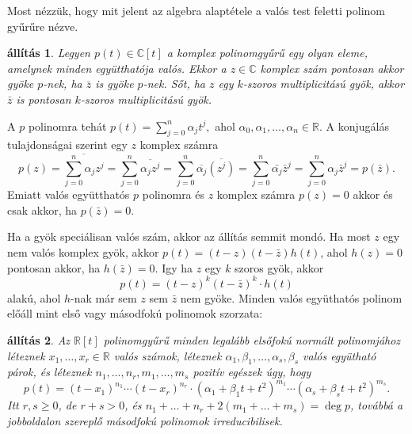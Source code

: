 \documentclass[9pt, showtrims]{memoir}
\makeatletter
\renewenvironment{proof}[1][\proofname]
    {\par\pushQED{\qed}%
    \normalfont \topsep6\p@\@plus6\p@\relax
    \trivlist
    \item[\hskip\labelsep
        \itshape
    #1\@addpunct{:}]\ignorespaces}
    {\popQED\endtrivlist\@endpefalse}
\theoremstyle{plain}
\newtheorem{proposition}{állítás}[section]
\theoremstyle{remark}
\theoremstyle{definition}
\makeatother
\begin{document}
Most nézzük, hogy mit jelent az algebra alaptétele a valós test feletti polinom gyűrűre nézve.
\begin{proposition}
    Legyen $p\left( t \right)\in\mathbb{C}[t]$ a komplex polinomgyűrű egy olyan eleme, 
    amelynek minden együtthatója valós.
    Ekkor a $z\in \mathbb{C}$ komplex szám pontosan akkor gyöke $p$-nek, 
    ha $\bar{z}$ is gyöke $p$-nek.
    Sőt, ha $z$ egy $k$-szoros multiplicitású gyök, 
    akkor $\bar{z}$ is pontosan $k$-szoros multiplicitású gyök.
\end{proposition}
\begin{proof}
    A $p$ polinomra tehát 
    \begin{math}
        p\left( t \right)
        =
        \sum_{j=0}^n\alpha_jt^j,
    \end{math}
    ahol $\alpha_0,\alpha_1,\dots,\alpha_n\in\mathbb{R}$.
    A konjugálás tulajdonságai szerint egy $z$ komplex számra
    \[
        p\left( z \right)=
        \overline{
        \sum_{j=0}^n\alpha_jz^j
        }
        =
        \sum_{j=0}^n\overline{\alpha_jz^j}
        =
        \sum_{j=0}^n\overline{\alpha_j}\overline{(z^j)}
        =
        \sum_{j=0}^n\bar{\alpha_j}\bar{z}^j
        =
        \sum_{j=0}^n\alpha_j\bar{z}^j
        =
        p\left(\bar{z} \right).
    \]
    Emiatt valós együtthatós $p$ polinomra és $z$ komplex számra 
    $p\left( z \right)=0$ akkor és csak akkor, ha $p\left( \bar{z} \right)=0.$

    Ha a gyök speciálisan valós szám, akkor az állítás semmit mondó.
    Ha most $z$ egy nem valós komplex gyök,
    akkor $p(t)=\left( t-z \right)\left( t-\bar{z} \right)h\left( t \right)$, ahol 
    $h\left( z \right)=0$ pontosan akkor, ha $h\left( \bar{z} \right)=0$.
    Igy ha $z$ egy $k$ szoros gyök,
    akkor
    \[
        p\left( t \right)=\left( t-z \right)^{k}\left( t-\bar{z} \right)^{k}\cdot h\left( t \right)
    \]
    alakú, ahol $h$-nak már sem $z$ sem $\bar{z}$ nem gyöke.
\end{proof}
Minden valós együthatós polinom előáll mint első vagy másodfokú polinomok szorzata:
\begin{proposition}\label{pr:RealPolFact}
    Az $\mathbb{R}[t]$ polinomgyűrű minden legalább elsőfokú normált polinomjához
    léteznek $x_1,\dots,x_r\in\mathbb{R}$ valós számok,
    léteznek $\alpha_1,\beta_1,\dots,\alpha_s,\beta_s$ valós együtható párok, 
    és léteznek
    $n_1,\dots,n_r, m_1,\dots,m_s$ pozitív egészek úgy, hogy
    \[
        p\left( t \right)
        =
        \left( t-x_1 \right)^{n_1}
        \cdots
        \left( t-x_r \right)^{n_r}
        \cdot
        \left(\alpha_1 + \beta_1t +t^2\right)^{m_1}
        \cdots
        \left(\alpha_s + \beta_st +t^2\right)^{m_s}.
    \]
    Itt $r,s\geq 0$, de $r+s>0$, és $n_1+\dots+n_r+2\left( m_1+\dots+m_s \right)=\deg p$, 
    továbbá a jobboldalon szereplő másodfokú polinomok irreducibilisek.
\end{proposition}
\end{document}
